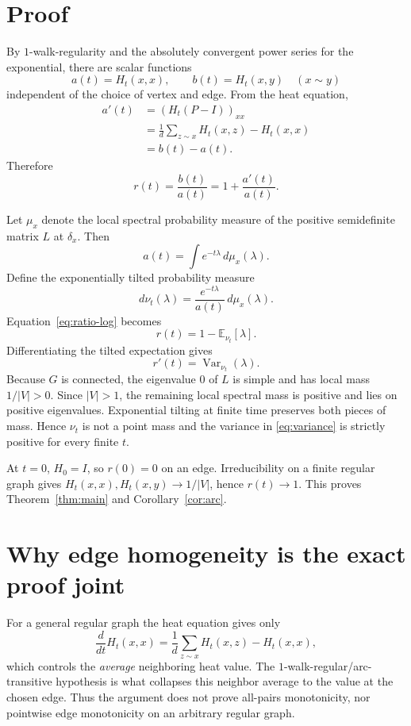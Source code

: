 \documentclass[11pt]{article}
\begin{document}
\section{Proof}
By $1$-walk-regularity and the absolutely convergent power series for the exponential, there are scalar functions
\[
a(t)=H_t(x,x),\qquad b(t)=H_t(x,y)\quad(x\sim y)
\]
independent of the choice of vertex and edge. From the heat equation,
\[
\begin{aligned}
a'(t)
&=(H_t(P-I))_{xx}\\
&=\frac1d\sum_{z\sim x}H_t(x,z)-H_t(x,x)\\
&=b(t)-a(t).
\end{aligned}
\]
Therefore
\begin{equation}\label{eq:ratio-log}
r(t)=\frac{b(t)}{a(t)}=1+\frac{a'(t)}{a(t)}.
\end{equation}

Let $\mu_x$ denote the local spectral probability measure of the positive semidefinite matrix $L$ at $\delta_x$. Then
\[
a(t)=\int e^{-t\lambda}\,d\mu_x(\lambda).
\]
Define the exponentially tilted probability measure
\[
d\nu_t(\lambda)=\frac{e^{-t\lambda}}{a(t)}\,d\mu_x(\lambda).
\]
Equation~\eqref{eq:ratio-log} becomes
\[
r(t)=1-\mathbb E_{\nu_t}[\lambda].
\]
Differentiating the tilted expectation gives
\begin{equation}\label{eq:variance}
\boxed{\quad r'(t)=\operatorname{Var}_{\nu_t}(\lambda).\quad}
\end{equation}
Because $G$ is connected, the eigenvalue $0$ of $L$ is simple and has local mass $1/|V|>0$. Since $|V|>1$, the remaining local spectral mass is positive and lies on positive eigenvalues. Exponential tilting at finite time preserves both pieces of mass. Hence $\nu_t$ is not a point mass and the variance in \eqref{eq:variance} is strictly positive for every finite $t$.

At $t=0$, $H_0=I$, so $r(0)=0$ on an edge. Irreducibility on a finite regular graph gives $H_t(x,x),H_t(x,y)\to1/|V|$, hence $r(t)\to1$. This proves Theorem~\ref{thm:main} and Corollary~\ref{cor:arc}.

\section{Why edge homogeneity is the exact proof joint}
For a general regular graph the heat equation gives only
\[
\frac{d}{dt}H_t(x,x)=\frac1d\sum_{z\sim x}H_t(x,z)-H_t(x,x),
\]
which controls the \emph{average} neighboring heat value. The $1$-walk-regular/arc-transitive hypothesis is what collapses this neighbor average to the value at the chosen edge. Thus the argument does not prove all-pairs monotonicity, nor pointwise edge monotonicity on an arbitrary regular graph.
\end{document}
